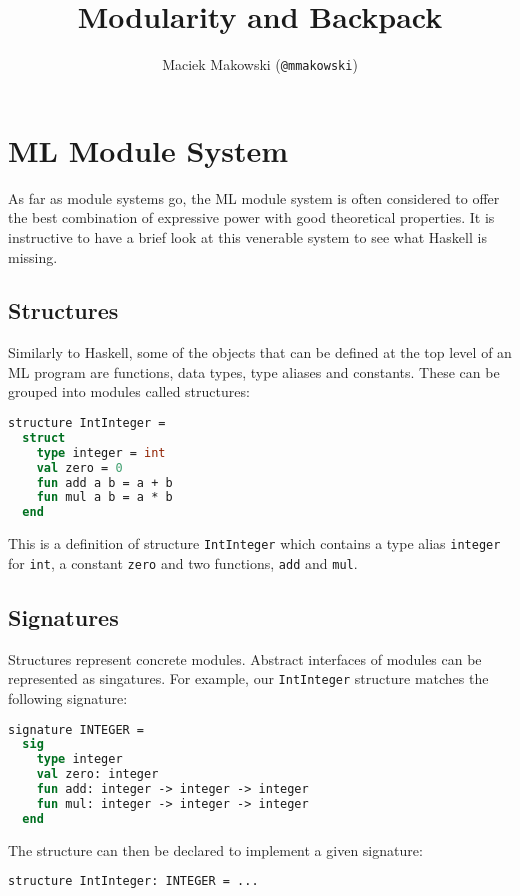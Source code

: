 \documentclass[11pt,twoside,a4paper]{article} %
\begin{document}
\title{Modularity and Backpack}
\author{Maciek Makowski (\texttt{@mmakowski})}
\maketitle

\newcommand{\code}[1]{\texttt{#1}}

\section{ML Module System}

As far as module systems go, the ML module system is often considered to offer the best combination of expressive power with good theoretical properties\cite{Dreyer05}. It is instructive to have a brief look at this venerable system to see what Haskell is missing.

\subsection{Structures}

Similarly to Haskell, some of the objects that can be defined at the top level of an ML program are functions, data types, type aliases and constants. These can be grouped into modules called structures:

\begin{lstlisting}[language=ML]
structure IntInteger =
  struct
    type integer = int
    val zero = 0
    fun add a b = a + b
    fun mul a b = a * b
  end
\end{lstlisting}
This is a definition of structure \code{IntInteger} which contains a type alias \code{integer} for \code{int}, a constant \code{zero} and two functions, \code{add} and \code{mul}. 

\subsection{Signatures}

Structures represent concrete modules. Abstract interfaces of modules can be represented as singatures. For example, our \code{IntInteger} structure matches the following signature:
\begin{lstlisting}[language=ML]
signature INTEGER =
  sig
    type integer
    val zero: integer
    fun add: integer -> integer -> integer
    fun mul: integer -> integer -> integer
  end
\end{lstlisting}
The structure can then be declared to implement a given signature:
\begin{lstlisting}[language=ML]
structure IntInteger: INTEGER = ...
\end{lstlisting}
\end{document}
